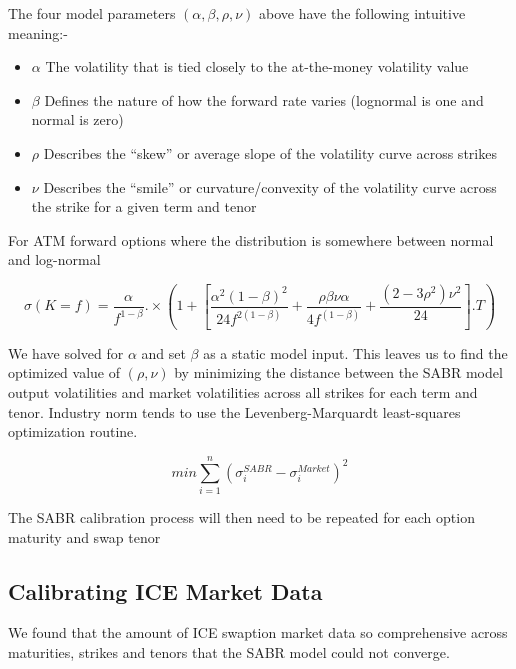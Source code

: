 \documentclass[11pt]{article}
\begin{document}
	The four model parameters $(\alpha, \beta , \rho, \nu )$ above have the following intuitive meaning:- \par

\begin{itemize}
	\item  $\alpha$ \quad The volatility that is tied closely to the at-the-money volatility value
	\item  $\beta$ \quad Defines the nature of how the forward rate varies (lognormal is one and normal is zero)
	\item  $\rho$ \quad  Describes the “skew” or average slope of the volatility curve across strikes
	\item  $\nu$ \quad Describes the “smile” or curvature/convexity of the volatility curve across the strike for a given term and tenor
\end{itemize}

For ATM forward options where the distribution is somewhere between normal and log-normal

\begin{equation}
	\sigma(K=f) = \displaystyle \dfrac{\alpha}{f^{1-\beta}}. \times \left ( 1 + \left [\dfrac{ \alpha^2 (1 - \beta)^2}{24f^{2(1-\beta)}} + \frac{\rho\beta\nu\alpha}{4f^{(1-\beta)}} +\frac{(2-3 \rho^2)\nu^2}{24} \right ].T \right)
\end{equation}

We have solved for $\alpha$ and set $\beta$ as a static model input.  This leaves us to find the optimized value of 
$(\rho, \nu)$ by minimizing the distance between the SABR model output volatilities and market volatilities across all strikes for each term and tenor.  Industry norm tends to use the Levenberg-Marquardt least-squares optimization routine. \par
\begin{equation}
	min \sum_{i=1}^{n} \left (  \sigma_i^{SABR} - \sigma_{i}^{Market} \right )^2
\end{equation}

The SABR calibration process will then need to be repeated for each option maturity and swap tenor \par

\subsection{Calibrating ICE Market Data}

We found that the amount of ICE swaption market data so comprehensive across maturities, strikes and tenors that the SABR model could not converge.  \par
\end{document}

